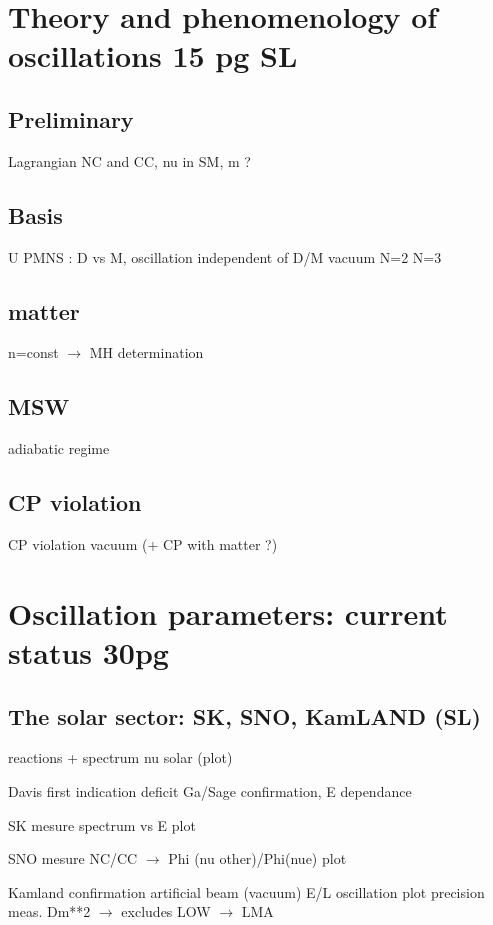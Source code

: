 \documentclass[preprint,12pt]{elsarticle}
\begin{document}
\section{Theory and phenomenology of oscillations 15 pg SL}
\label{sec:th}

\subsection{Preliminary}

Lagrangian NC and CC, nu in SM, m ?

\subsection{Basis}

U PMNS : D vs M, oscillation independent of D/M
vacuum N=2 N=3

\subsection{matter}
n=const  $\rightarrow$ MH determination 

\subsection{MSW}
adiabatic regime


\subsection{CP violation}

CP violation vacuum (+ CP with matter ?)


\section{Oscillation parameters: current status 30pg}
\label{sec:status}

\subsection{The solar sector: SK, SNO, KamLAND  (SL)}

reactions + spectrum nu solar (plot)

Davis first indication deficit Ga/Sage confirmation, E dependance

SK mesure spectrum vs E plot

SNO mesure NC/CC  $\rightarrow$ Phi (nu other)/Phi(nue) plot

Kamland confirmation artificial beam (vacuum) E/L oscillation plot precision meas. Dm**2 $\rightarrow$ excludes LOW  $\rightarrow$ LMA 
\end{document}
